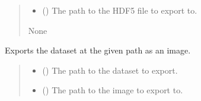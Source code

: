 \documentclass[letterpaper,10pt,english]{sphinxmanual}
\begin{document}
\begin{fulllineitems}
\begin{fulllineitems}
\begin{quote}
\begin{description}
\begin{itemize}
\item {} 
\sphinxAtStartPar
{} () \textendash{} The path to the HDF5 file to export to.

\end{itemize}

\sphinxAtStartPar
None

\end{description}\end{quote}

\end{fulllineitems}


\begin{fulllineitems}
\label{\detokenize{source/HDF5_BLS:HDF5_BLS.wrapper.Wrapper.export_image}}
\pysigstartsignatures
\pysiglinewithargsret
{}
{\sphinxparamcomma {}\sphinxparamcomma {}\sphinxparamcomma {}\sphinxparamcomma {}\sphinxparamcomma {}\sphinxparamcomma {}\sphinxparamcomma {}\sphinxparamcomma {}\sphinxparamcomma {}}
{}
\pysigstopsignatures
\sphinxAtStartPar
Exports the dataset at the given path as an image.
\begin{quote}\begin{description}
\begin{itemize}
\item {} 
\sphinxAtStartPar
{} () \textendash{} The path to the dataset to export.

\item {} 
\sphinxAtStartPar
{} () \textendash{} The path to the image to export to.


\end{itemize}
\end{description}
\end{quote}
\end{fulllineitems}
\end{fulllineitems}
\end{document}
